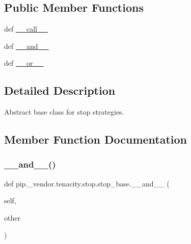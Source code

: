 \subsection*{Public Member Functions}
\begin{DoxyCompactItemize}
\item 
def \hyperlink{classpip_1_1__vendor_1_1tenacity_1_1stop_1_1stop__base_a50bc03b52a5d06fe2d6f6d5061660479}{\+\_\+\+\_\+call\+\_\+\+\_\+}
\item 
def \hyperlink{classpip_1_1__vendor_1_1tenacity_1_1stop_1_1stop__base_aaac830cea9ce003b7e526086e31a186a}{\+\_\+\+\_\+and\+\_\+\+\_\+}
\item 
def \hyperlink{classpip_1_1__vendor_1_1tenacity_1_1stop_1_1stop__base_ab032e246e77a5dfd2da1c7816c6df305}{\+\_\+\+\_\+or\+\_\+\+\_\+}
\end{DoxyCompactItemize}


\subsection{Detailed Description}
\begin{DoxyVerb}Abstract base class for stop strategies.\end{DoxyVerb}
 

\subsection{Member Function Documentation}
\mbox{\label{classpip_1_1__vendor_1_1tenacity_1_1stop_1_1stop__base_aaac830cea9ce003b7e526086e31a186a}} 
\subsubsection{\texorpdfstring{\+\_\+\+\_\+and\+\_\+\+\_\+()}{\_\_and\_\_()}}
{\footnotesize\ttfamily def pip.\+\_\+vendor.\+tenacity.\+stop.\+stop\+\_\+base.\+\_\+\+\_\+and\+\_\+\+\_\+ (\begin{DoxyParamCaption}\item[{}]{self,  }\item[{}]{other }\end{DoxyParamCaption})}

